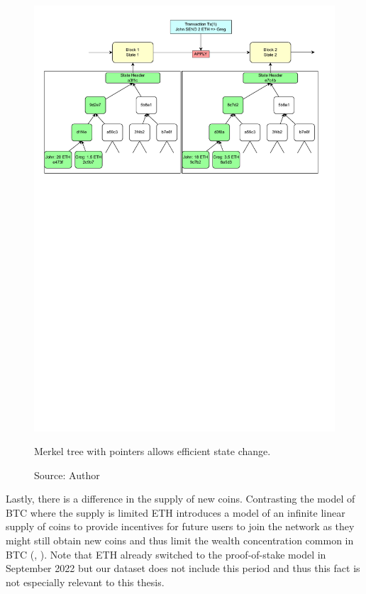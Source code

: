 \begin{center}
    \begin{figure}[H]
        \centering
            \includegraphics[width=1\textwidth]{Figures/merkle-tree.pdf}
        \caption{Merkel tree with pointers allows efficient state change.}
        \caption*{Source: Author}
        \label{fig:merkel}
    \end{figure}
\end{center}


Lastly, there is a difference in the supply of new coins.
Contrasting the model of \ac{BTC} where the supply is limited \ac{ETH} introduces 
a model of an infinite linear supply of coins to provide incentives 
for future users to join the network as they might still obtain 
new coins and thus limit the wealth concentration common in \ac{BTC} (\cite{buterin2013ethereum}, \cite{Tikhomirov2018}).
Note that \ac{ETH} already switched to the proof-of-stake model in September 2022
but our dataset does not include this period and thus this fact 
is not especially relevant to this thesis.


